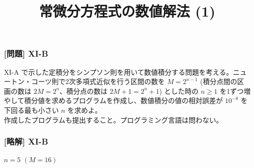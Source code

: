 \documentclass[dvipdfmx,aspectratio=169,20pt]{beamer}
\newcommand{\myfontsetting}[3]{{\fontsize{#1}{#2}\selectfont #3}}
\begin{document}
\begin{frame}
\frametitle{[問題] X\hspace{-.1em}I-B}

\myfontsetting{18pt}{18pt}{
X\hspace{-.1em}I-A で示した定積分をシンプソン則を用いて数値積分する問題を考える。ニュートン・コーツ則で2次多項式近似を行う区間の数を $M=2^{n-1}$ (積分点間の区画の数は $2M=2^n$、積分点の数は $2M+1=2^n+1$) とした時の $n\ge 1$ を1ずつ増やして積分値を求めるプログラムを作成し、数値積分の値の相対誤差が $10^{-8}$ を下回る最も小さい $n$ を求めよ。
}\\
\myfontsetting{12pt}{12pt}{
作成したプログラムも提出すること。プログラミング言語は問わない。
}
\end{frame}
\begin{frame}
\frametitle{[略解] X\hspace{-.1em}I-B}

$n=5$ $(M=16)$

\end{frame}

\title{\myfontsetting{32pt}{32pt}{常微分方程式の数値解法 (1)}}


\end{document}
